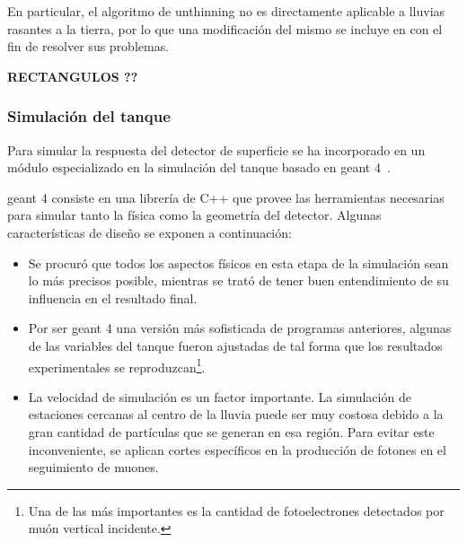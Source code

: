 		En particular, el algoritmo de unthinning no es directamente aplicable a lluvias rasantes a la tierra, por lo que una modificaci\'on del mismo se incluye en \Offline{} con el fin de resolver sus problemas.
		
		\textbf{RECTANGULOS ??}
		
		\subsubsection{Simulaci\'on del tanque}
		
		Para simular la respuesta del detector de superficie se ha incorporado en \Offline{} un m\'odulo especializado en la simulaci\'on del tanque basado en {\sc geant 4}~\cite{geant4}.
		
		{\sc geant 4} consiste en una librer\'ia de C++ que provee las herramientas necesarias para simular tanto la f\'isica como la geometr\'ia del detector.
		Algunas caracter\'isticas de dise\~no se exponen a continuaci\'on:
		\begin{itemize}
		\item Se procur\'o que todos los aspectos f\'isicos en esta etapa de la simulaci\'on sean lo m\'as precisos posible, mientras se trat\'o de tener buen entendimiento de su influencia en el resultado final.
		\item Por ser {\sc geant 4} una versi\'on m\'as sofisticada de programas anteriores, algunas de las variables del tanque fueron ajustadas de tal forma que los resultados experimentales se reproduzcan\footnote{Una de las m\'as importantes es la cantidad de fotoelectrones detectados por mu\'on vertical incidente.}.
		\item La velocidad de simulaci\'on es un factor importante.
		La simulaci\'on de estaciones cercanas al centro de la lluvia puede ser muy costosa debido a la gran cantidad de part\'iculas que se generan en esa regi\'on. Para evitar este inconveniente, se aplican cortes espec\'ificos en la producci\'on de fotones en el seguimiento de muones.
		\end{itemize}
		
